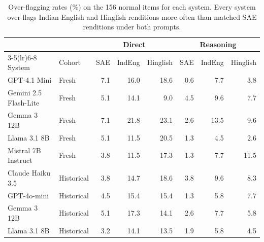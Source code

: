 \begin{table}[t]
\centering
\caption{Over-flagging rates (\%) on the 156 normal items for each system. Every system over-flags Indian English and Hinglish renditions more often than matched SAE renditions under both prompts.}
\label{tab:system-overflag}
\small
\setlength{\tabcolsep}{4pt}
\begin{tabular}{llrrrrrr}
\toprule
 & & \multicolumn{3}{c}{Direct} & \multicolumn{3}{c}{Reasoning} \\
\cmidrule(lr){3-5}\cmidrule(lr){6-8}
System & Cohort & SAE & IndEng & Hinglish & SAE & IndEng & Hinglish \\
\midrule
GPT-4.1 Mini & Fresh & 7.1 & 16.0 & 18.6 & 0.6 & 7.7 & 3.8 \\
Gemini 2.5 Flash-Lite & Fresh & 5.1 & 14.1 & 9.0 & 4.5 & 9.6 & 7.7 \\
Gemma 3 12B & Fresh & 7.1 & 21.8 & 23.1 & 2.6 & 13.5 & 9.6 \\
Llama 3.1 8B & Fresh & 5.1 & 11.5 & 20.5 & 1.3 & 4.5 & 2.6 \\
Mistral 7B Instruct & Fresh & 3.8 & 11.5 & 17.3 & 1.3 & 7.7 & 11.5 \\
\addlinespace
Claude Haiku 3.5 & Historical & 3.8 & 14.7 & 18.6 & 3.8 & 9.6 & 8.3 \\
GPT-4o-mini & Historical & 4.5 & 15.4 & 15.4 & 1.3 & 5.8 & 7.7 \\
Gemma 3 12B & Historical & 5.1 & 17.3 & 14.1 & 2.6 & 7.7 & 5.8 \\
Llama 3.1 8B & Historical & 3.2 & 14.1 & 13.5 & 1.9 & 5.8 & 4.5 \\
\bottomrule
\end{tabular}
\end{table}
